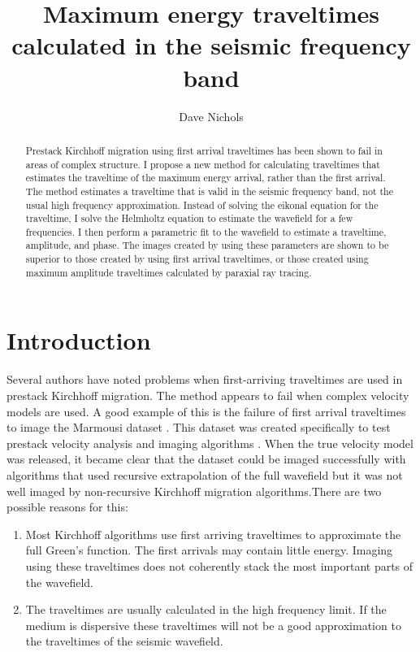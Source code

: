 \title{Maximum energy traveltimes calculated in the seismic frequency
  band}

\author{Dave Nichols}


\begin{abstract}
Prestack Kirchhoff migration using first arrival traveltimes has been
shown to fail in areas of complex structure. I propose a new method
for calculating traveltimes that estimates the traveltime of the
maximum energy arrival, rather than the first arrival. 
The method estimates a traveltime that is valid in the seismic
frequency band, not the usual high frequency approximation. Instead
of solving the eikonal equation for the traveltime, I solve the
Helmholtz equation to estimate the wavefield for a few frequencies. I
then perform a parametric fit to the wavefield to estimate a
traveltime, amplitude, and phase. 
The images created by using these parameters are shown to be superior
to those created by using first arrival traveltimes, or those created
using maximum amplitude traveltimes calculated by paraxial ray
tracing.
\end{abstract}

\section{Introduction}

Several authors have noted problems when first-arriving traveltimes
are used in prestack Kirchhoff migration. The method appears to fail
when complex velocity models are used. A good example of this is the
failure of first arrival traveltimes to image the Marmousi dataset
\cite{GEO58.04.564}. This dataset was created specifically to test
prestack velocity analysis and imaging algorithms \cite{marm-exp}.
When the true velocity model was released, it became clear that the
dataset could be imaged successfully with algorithms that used
recursive extrapolation of the full wavefield but it was not well
imaged by non-recursive Kirchhoff migration algorithms.There are two
possible reasons for this:
\begin{enumerate}
\item Most Kirchhoff algorithms use first arriving traveltimes to approximate
the full Green's function. The first arrivals may contain
little energy. Imaging using these traveltimes does not
coherently stack the most important parts of the wavefield.
\item The traveltimes are usually calculated in the high frequency limit.
If the medium is dispersive these traveltimes will not be a good
approximation to the traveltimes of the seismic wavefield.
\end{enumerate}


